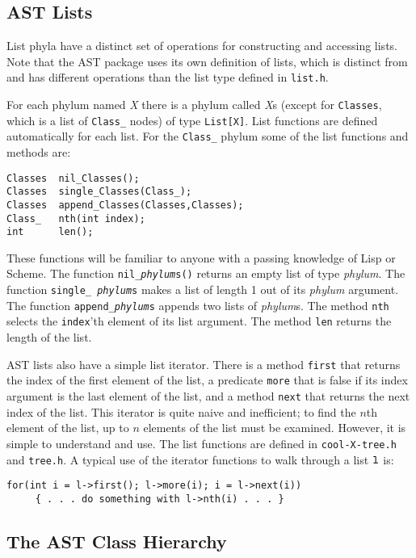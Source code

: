 \documentclass[11pt]{article}
\begin{document}
\subsection{AST Lists}
\label{sec-lists}

List phyla have a distinct set of operations for constructing and
accessing lists.  Note that the AST package uses its own definition of
lists, which is distinct from and has different operations than
the list type defined in {\tt list.h}.

For each phylum named {\em X}
there is a phylum called {\em X}s (except for {\tt Classes}, which is
a list of {\tt Class\_} nodes) of type {\tt List[X]}.  List functions are defined
automatically for each list.  For the {\tt Class\_} phylum some of the
list functions and methods are:
\begin{verbatim}
Classes  nil_Classes();
Classes  single_Classes(Class_);
Classes  append_Classes(Classes,Classes);
Class_   nth(int index);
int      len();
\end{verbatim}
These functions will be familiar to anyone with a passing knowledge of
Lisp or Scheme.  The function {\tt nil\_{\em phylum}s()} returns an
empty list of type {\em phylum}.  The function {\tt single\_{\em
phylum}s} makes a list of length 1 out of its {\em phylum}
argument. The function {\tt append\_{\em phylum}s} appends two lists of
{\em phylum}s.  The method {\tt nth} selects the {\tt index}'th element of
its list argument.  The method {\tt len} returns the length of the list.

AST lists also have a simple list iterator.  There is a method {\tt first}
that returns the index of the first element of the list, a predicate {\tt more}
that is false if its index argument is the last element of the list, and
a method {\tt next} that returns the next index of the list.  This iterator
is quite naive and inefficient; to find the $n$th element of the list,
up to $n$ elements of the list must be examined.  However, it is simple
to understand and use.
The list functions are defined in {\tt cool-X-tree.h} and {\tt tree.h}.
A typical use of the iterator functions to walk through a list $\tt l$ is:
\begin{verbatim}
for(int i = l->first(); l->more(i); i = l->next(i))
     { . . . do something with l->nth(i) . . . }
\end{verbatim}

\subsection{The AST Class Hierarchy}
\end{document}
